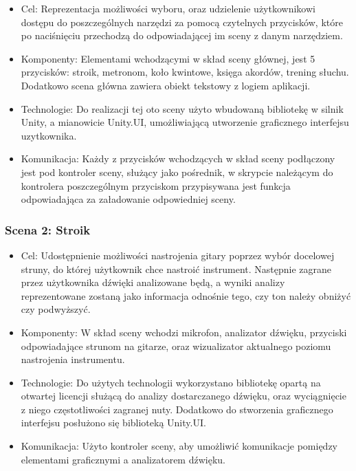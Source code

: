 \begin{itemize}

\item Cel: Reprezentacja możliwości wyboru, oraz udzielenie użytkownikowi dostępu do poszczególnych narzędzi za pomocą czytelnych przycisków, które po naciśnięciu przechodzą do odpowiadającej im sceny z danym narzędziem. 
\item Komponenty: Elementami wchodzącymi w skład sceny głównej, jest 5 przycisków: stroik, metronom, koło kwintowe, księga akordów, trening słuchu. Dodatkowo scena główna zawiera obiekt tekstowy z logiem aplikacji.  
\item Technologie: Do realizacji tej oto sceny użyto wbudowaną bibliotekę w silnik Unity, a mianowicie Unity.UI, umożliwiającą utworzenie graficznego interfejsu uzytkownika. 
\item Komunikacja: Każdy z przycisków wchodzących w skład sceny podłączony jest pod kontroler sceny, służący jako pośrednik, w skrypcie należącym do kontrolera poszczególnym przyciskom przypisywana jest funkcja odpowiadająca za załadowanie odpowiedniej sceny. 
\end{itemize}

\subsubsection{Scena 2: Stroik}

\begin{itemize}
\item Cel: Udostępnienie możliwości nastrojenia gitary poprzez wybór docelowej struny, do której użytkownik chce nastroić instrument. Następnie zagrane przez użytkownika dźwięki analizowane będą, a wyniki analizy reprezentowane zostaną jako informacja odnośnie tego, czy ton należy obniżyć czy podwyższyć.
\item Komponenty: W skład sceny wchodzi mikrofon, analizator dźwięku, przyciski odpowiadające strunom na gitarze, oraz wizualizator aktualnego poziomu nastrojenia instrumentu.  
\item Technologie: Do użytych technologii wykorzystano bibliotekę opartą na otwartej licencji służącą do analizy dostarczanego dźwięku, oraz wyciągnięcie z niego częstotliwości zagranej nuty. Dodatkowo do stworzenia graficznego interfejsu posłużono się biblioteką Unity.UI.   
\item Komunikacja: Użyto kontroler sceny, aby umożliwić komunikacje pomiędzy elementami graficznymi a analizatorem dźwięku. 
\end{itemize}

